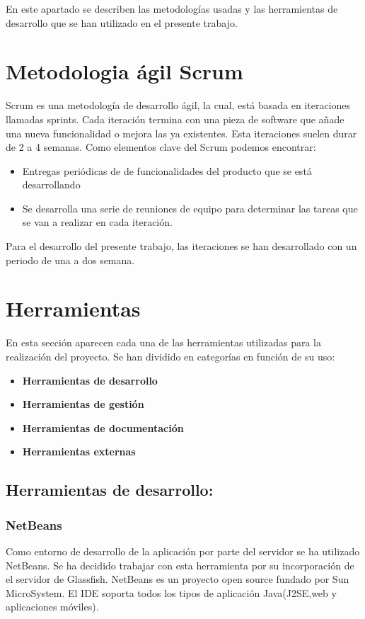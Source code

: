 
En este apartado se describen las metodologías usadas y las herramientas de desarrollo que se han utilizado en el presente trabajo.

\section{Metodologia ágil Scrum \label{scrum}}
Scrum es una metodología de desarrollo ágil, la cual, está basada en iteraciones llamadas sprints. Cada iteración termina con una pieza de software que añade una nueva funcionalidad o mejora las ya existentes. Esta iteraciones suelen durar de 2 a 4 semanas\cite{scrum}.
Como elementos clave del Scrum podemos encontrar:
\begin{itemize}
\item Entregas periódicas de de funcionalidades del producto que se está desarrollando
\item Se desarrolla una serie de reuniones de equipo para determinar las tareas que se van a realizar en cada iteración.
\end{itemize}

Para el desarrollo del presente trabajo, las iteraciones se han desarrollado con un periodo de una a dos semana.

\section{Herramientas}
En esta sección aparecen cada una de las herramientas utilizadas para la realización del proyecto.
Se han dividido en categorías en función de su uso:
\begin{itemize}
	\item \textbf{Herramientas de desarrollo}
	\item \textbf{Herramientas de gestión}
	\item \textbf{Herramientas de documentación}
	\item \textbf{Herramientas externas}
\end{itemize}

\subsection{Herramientas de desarrollo:}
\subsubsection{NetBeans}
Como entorno de desarrollo de la aplicación por parte del servidor se ha utilizado NetBeans. Se ha decidido trabajar con esta herramienta por su incorporación de el servidor de Glassfish.
NetBeans es un proyecto open source fundado por Sun MicroSystem. El IDE soporta todos los tipos de aplicación Java(J2SE,web y aplicaciones móviles).

